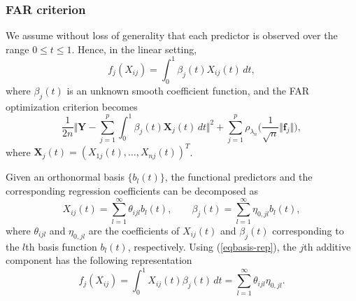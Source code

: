 \documentclass[aos,MSNbibl,dvips]{arximspdf}
\newcommand{\rrVert}{\Vert}
\newcommand{\llVert}{\Vert}
\newcommand{\bY}{{\mathbf Y}}
\newcommand{\bb}{\mathbf{b}}
\newcommand{\bX}{{\mathbf X}}
\newcommand{\bff}{{\mathbf f}}
\begin{document}
\subsubsection{FAR criterion}

We assume without loss of generality that each predictor is observed
over the range $0\le t \le1$. Hence, in the linear setting,
%
\begin{equation}
\label{linearf} f_j(X_{ij}) = \int_0^1
\beta_j(t)X_{ij}(t)\,dt,
\end{equation}
%
where $\beta_j(t)$ is an unknown smooth coefficient function, and the
FAR optimization criterion becomes
%
\begin{equation}
\label{linearfar} \frac{1}{2n} \Biggl\llVert\bY-\sum
_{j=1}^p \int_0^1
\beta_j(t) \bX_j(t)\,dt\Biggr\rrVert^2 +
\sum_{j=1}^p \rho_{\lambda_n} \biggl(
\frac{1}{\sqrt{n}}\llVert\bff_j\rrVert\biggr),
\end{equation}
%
where $\bX_j(t)= (X_{1j}(t),\ldots,X_{nj}(t) )^T$.

Given an orthonormal basis $\{b_{l}(t)\}$, the functional predictors
and the corresponding regression coefficients can be decomposed as
%
\begin{equation}
\label{eqbasis-rep} X_{ij}(t) = \sum_{l=1}^\infty
\theta_{ijl}b_l(t), \qquad\beta_j(t) = \sum
_{l=1}^\infty\eta_{0,jl}b_l(t),
\end{equation}
%
where $\theta_{ijl}$ and $\eta_{0,jl}$ are the coefficients of
$X_{ij}(t)$ and $\beta_j(t)$ corresponding to the $l$th basis function
$b_l(t)$, respectively. Using (\ref{eqbasis-rep}), the $j$th additive
component has the following representation
%
\begin{equation}
\label{fexpan} f_j(X_{ij}) = \int_0^1
X_{ij}(t)\beta_j(t)\,dt = \sum_{l=1}^\infty
\theta_{ijl}\eta_{0,jl}.
\end{equation}
\end{document}
